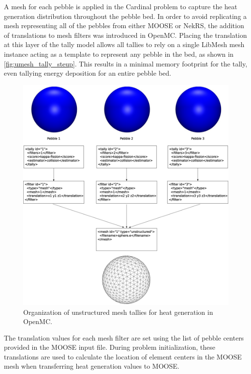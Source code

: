 A mesh for each pebble is applied in the Cardinal problem to capture the heat generation distribution throughout the pebble bed. In order to avoid replicating a mesh representing all of the pebbles from either MOOSE or NekRS, the addition of translations to mesh filters was introduced in OpenMC. Placing the translation at this layer of the tally model allows all tallies to rely on a single LibMesh mesh instance acting as a template to represent any pebble in the bed, as shown in \autoref{fig:umesh_tally_steup}. This results in a minimal memory footprint for the tally, even tallying energy deposition for an entire pebble bed.

\begin{figure}[ht]
    \centering
    \includegraphics[width=\textwidth]{Figures/umesh_tally_diagram}
    \caption{Organization of unstructured mesh tallies for heat generation in OpenMC.}
    \label{fig:umesh_tally_steup}
\end{figure}

The translation values for each mesh filter are set using the list of pebble centers provided in the MOOSE input file. During problem initialization, these translations are used to calculate the location of element centers in the MOOSE mesh when transferring heat generation values to MOOSE.

